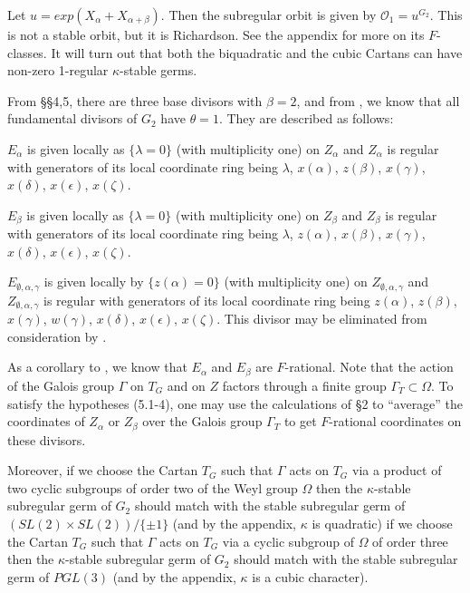 \documentclass[12pt,letterpaper]{amsart}
\begin{document}
Let $u=exp(X_\alpha+X_{\alpha+\beta})$. Then the subregular orbit
is given by ${\mathcal O}_1=u^{G_2}$. This is not a stable orbit,
but it is Richardson.
See the appendix for more on its $F$-classes.
It will turn out that both the biquadratic and the cubic Cartans
can have non-zero 1-regular $\kappa$-stable germs.

From \S\S 4,5, there are three base divisors with $\beta =2$,
and from \cite[ch. VI, \S 2]{Ha92a}, we know that all fundamental divisors
of $G_2$ have $\theta =1$.
They are described as follows:

$E_\alpha$ is given locally as $\{\lambda =0\}$
(with multiplicity one) on $Z_\alpha$
and $Z_\alpha$ is regular with generators of its local coordinate ring
being $\lambda$, $x(\alpha)$, $z(\beta)$, $x(\gamma)$,
$x(\delta)$, $x(\epsilon)$, $x(\zeta)$.

$E_\beta$ is given locally as $\{\lambda =0\}$ (with multiplicity one)
on $Z_\beta$
and $Z_\beta$ is regular with generators of its local coordinate ring
being $\lambda$, $z(\alpha)$, $x(\beta)$, $x(\gamma)$,
$x(\delta)$, $x(\epsilon)$, $x(\zeta)$.

$E_{\emptyset,\alpha,\gamma}$ is given locally
by $\{z(\alpha) =0\}$ (with multiplicity one)
on $Z_{\emptyset,\alpha,\gamma}$ and $Z_{\emptyset,\alpha,\gamma}$
is regular with generators of its local coordinate ring
being $z(\alpha)$, $z(\beta)$, $x(\gamma)$, $w(\gamma)$,
$x(\delta)$, $x(\epsilon)$, $x(\zeta)$. This divisor may be eliminated
from consideration by \cite[Ch V, Lemma 1.1]{Ha92a}.

As a corollary to \cite[ch 6, Lemma 1.1]{Ha92a}, we know that
$E_\alpha$ and $E_\beta$ are $F$-rational. Note that the action of the Galois
group $\Gamma$ on $T_G$ and on $Z$ factors through a finite group
$\Gamma_{T}\subset \Omega$.
To satisfy the hypotheses (5.1-4), one may use
the calculations of \S 2 to ``average'' the coordinates of $Z_\alpha$ or
$Z_\beta$ over the Galois group $\Gamma_T$
to get $F$-rational coordinates on these divisors.

Moreover, if we choose the Cartan $T_G$ such that $\Gamma$ acts
on $T_G$ via a product of two cyclic subgroups of order two of the Weyl group
$\Omega$ then the $\kappa$-stable subregular germ
of $G_2$ should match with the stable subregular germ of
$(SL(2)\times SL(2))/\{\pm 1\}$
(and by the appendix, $\kappa$ is quadratic)
if we choose the Cartan $T_G$ such that $\Gamma$ acts on $T_G$
via a cyclic subgroup of $\Omega$ of order three
then the $\kappa$-stable subregular germ
of $G_2$ should match with the stable subregular germ of
$PGL(3)$ (and by the appendix, $\kappa$ is a cubic character).
\end{document}
